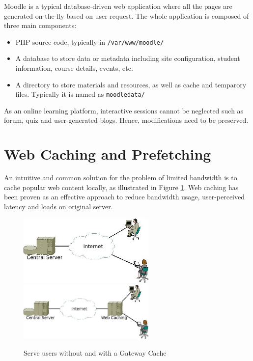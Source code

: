 Moodle is a typical database-driven web application where all the pages are generated on-the-fly based on user request. The whole application is composed of three main components: 
\begin{itemize}
\item PHP source code, typically in \texttt{/var/www/moodle/}
\item A database to store data or metadata including site configuration, student information, course details, events, etc.
\item A directory to store materials and resources, as well as cache and temparory files. Typically it is named as \texttt{moodledata/}
\end{itemize}

As an online learning platform, interactive sessions cannot be neglected such as forum, quiz and user-generated blogs. Hence, modifications need to be preserved.

\section{Web Caching and Prefetching}
An intuitive and common solution for the problem of limited bandwidth is to cache popular web content locally, as illustrated in Figure \ref{with_cache}. Web caching has been proven as an effective approach to reduce bandwidth usage, user-perceived latency and loads on original server\cite{davison2001web}.

\begin{figure}[h]
\centering
\includegraphics[width=0.6\textwidth]{../images/without_caching.jpeg}
\includegraphics[width=0.6\textwidth]{../images/with_caching.jpeg}
\caption{Serve users without and with a Gateway Cache}
\label{with_cache}
\end{figure}

